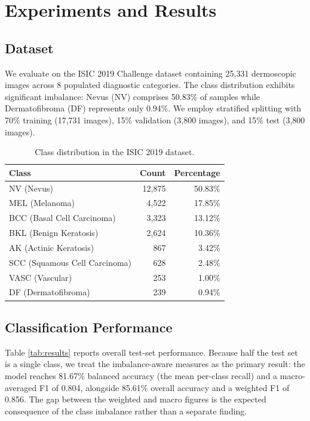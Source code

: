 \section{Experiments and Results}

\subsection{Dataset}

We evaluate on the ISIC 2019 Challenge dataset
\cite{combalia2019bcn20000,tschandl2018ham10000} containing 25,331
dermoscopic images across 8 populated diagnostic categories. The class
distribution exhibits significant imbalance: Nevus (NV) comprises 50.83\% of
samples while Dermatofibroma (DF) represents only 0.94\%. We employ stratified
splitting with 70\% training (17,731 images), 15\% validation (3,800
images), and 15\% test (3,800 images).

\begin{table}[t]
    \centering
    \caption{Class distribution in the ISIC 2019 dataset.}
    \label{tab:distribution}
    \begin{tabular}{lrr}
        \toprule
        Class                         & Count  & Percentage \\
        \midrule
        NV (Nevus)                    & 12,875 & 50.83\%    \\
        MEL (Melanoma)                & 4,522  & 17.85\%    \\
        BCC (Basal Cell Carcinoma)    & 3,323  & 13.12\%    \\
        BKL (Benign Keratosis)        & 2,624  & 10.36\%    \\
        AK (Actinic Keratosis)        & 867    & 3.42\%     \\
        SCC (Squamous Cell Carcinoma) & 628    & 2.48\%     \\
        VASC (Vascular)               & 253    & 1.00\%     \\
        DF (Dermatofibroma)           & 239    & 0.94\%     \\
        \bottomrule
    \end{tabular}
\end{table}

\subsection{Classification Performance}

Table \ref{tab:results} reports overall test-set performance. Because half the
test set is a single class, we treat the imbalance-aware measures as the primary
result: the model reaches 81.67\% balanced accuracy (the mean per-class recall)
and a macro-averaged F1 of 0.804, alongside 85.61\% overall accuracy and a
weighted F1 of 0.856. The gap between the weighted and macro figures is the
expected consequence of the class imbalance rather than a separate finding.

